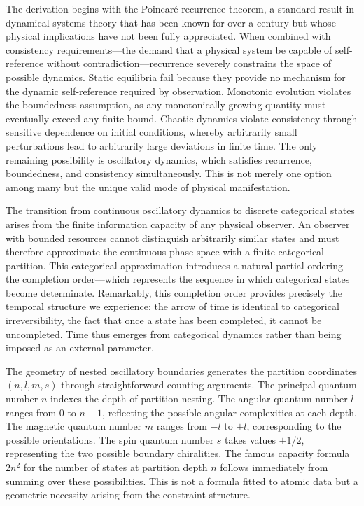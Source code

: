 \documentclass[11pt,a4paper]{article}
\theoremstyle{remark}
\begin{document}
The derivation begins with the Poincar\'{e} recurrence theorem, a standard result in dynamical systems theory that has been known for over a century but whose physical implications have not been fully appreciated. When combined with consistency requirements—the demand that a physical system be capable of self-reference without contradiction—recurrence severely constrains the space of possible dynamics. Static equilibria fail because they provide no mechanism for the dynamic self-reference required by observation. Monotonic evolution violates the boundedness assumption, as any monotonically growing quantity must eventually exceed any finite bound. Chaotic dynamics violate consistency through sensitive dependence on initial conditions, whereby arbitrarily small perturbations lead to arbitrarily large deviations in finite time. The only remaining possibility is oscillatory dynamics, which satisfies recurrence, boundedness, and consistency simultaneously. This is not merely one option among many but the unique valid mode of physical manifestation.

The transition from continuous oscillatory dynamics to discrete categorical states arises from the finite information capacity of any physical observer. An observer with bounded resources cannot distinguish arbitrarily similar states and must therefore approximate the continuous phase space with a finite categorical partition. This categorical approximation introduces a natural partial ordering—the completion order—which represents the sequence in which categorical states become determinate. Remarkably, this completion order provides precisely the temporal structure we experience: the arrow of time is identical to categorical irreversibility, the fact that once a state has been completed, it cannot be uncompleted. Time thus emerges from categorical dynamics rather than being imposed as an external parameter.

The geometry of nested oscillatory boundaries generates the partition coordinates $(n, l, m, s)$ through straightforward counting arguments. The principal quantum number $n$ indexes the depth of partition nesting. The angular quantum number $l$ ranges from $0$ to $n-1$, reflecting the possible angular complexities at each depth. The magnetic quantum number $m$ ranges from $-l$ to $+l$, corresponding to the possible orientations. The spin quantum number $s$ takes values $\pm 1/2$, representing the two possible boundary chiralities. The famous capacity formula $2n^2$ for the number of states at partition depth $n$ follows immediately from summing over these possibilities. This is not a formula fitted to atomic data but a geometric necessity arising from the constraint structure.
\end{document}
